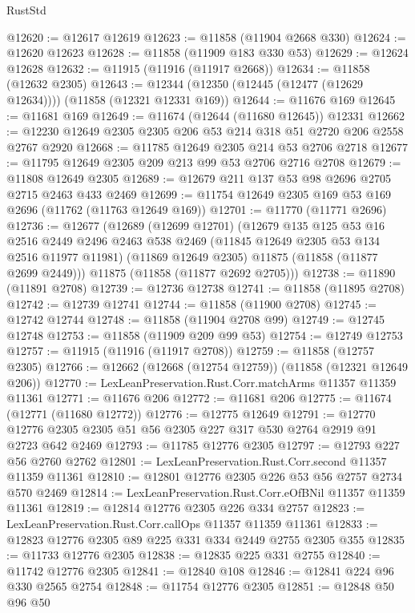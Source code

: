 \begin{lexlean}{RustStd}
\begin{coremodule}
@12620 := @12617 @12619
@12623 := @11858 (@11904 @2668 @330)
@12624 := @12620 @12623
@12628 := @11858 (@11909 @183 @330 @53)
@12629 := @12624 @12628
@12632 := @11915 (@11916 (@11917 @2668))
@12634 := @11858 (@12632 @2305)
@12643 := @12344 (@12350 (@12445 (@12477 (@12629 @12634)))) (@11858 (@12321 @12331 @169))
@12644 := @11676 @169
@12645 := @11681 @169
@12649 := @11674 (@12644 (@11680 @12645)) @12331
@12662 := @12230 @12649 @2305 @2305 @206 @53 @214 @318 @51 @2720 @206 @2558 @2767 @2920
@12668 := @11785 @12649 @2305 @214 @53 @2706 @2718
@12677 := @11795 @12649 @2305 @209 @213 @99 @53 @2706 @2716 @2708
@12679 := @11808 @12649 @2305
@12689 := @12679 @211 @137 @53 @98 @2696 @2705 @2715 @2463 @433 @2469
@12699 := @11754 @12649 @2305 @169 @53 @169 @2696 (@11762 (@11763 @12649 @169))
@12701 := @11770 (@11771 @2696)
@12736 := @12677
    (@12689
      (@12699 @12701)
      (@12679
        @135
        @125
        @53
        @16
        @2516
        @2449
        @2496
        @2463
        @538
        @2469
        (@11845 @12649 @2305 @53 @134 @2516 @11977 @11981)
        (@11869 @12649 @2305)
        @11875
        (@11858 (@11877 @2699 @2449)))
      @11875
      (@11858 (@11877 @2692 @2705)))
@12738 := @11890 (@11891 @2708)
@12739 := @12736 @12738
@12741 := @11858 (@11895 @2708)
@12742 := @12739 @12741
@12744 := @11858 (@11900 @2708)
@12745 := @12742 @12744
@12748 := @11858 (@11904 @2708 @99)
@12749 := @12745 @12748
@12753 := @11858 (@11909 @209 @99 @53)
@12754 := @12749 @12753
@12757 := @11915 (@11916 (@11917 @2708))
@12759 := @11858 (@12757 @2305)
@12766 := @12662 (@12668 (@12754 @12759)) (@11858 (@12321 @12649 @206))
@12770 := LexLeanPreservation.Rust.Corr.matchArms @11357 @11359 @11361
@12771 := @11676 @206
@12772 := @11681 @206
@12775 := @11674 (@12771 (@11680 @12772))
@12776 := @12775 @12649
@12791 := @12770 @12776 @2305 @2305 @51 @56 @2305 @227 @317 @530 @2764 @2919 @91 @2723 @642 @2469
@12793 := @11785 @12776 @2305
@12797 := @12793 @227 @56 @2760 @2762
@12801 := LexLeanPreservation.Rust.Corr.second @11357 @11359 @11361
@12810 := @12801 @12776 @2305 @226 @53 @56 @2757 @2734 @570 @2469
@12814 := LexLeanPreservation.Rust.Corr.eOfBNil @11357 @11359 @11361
@12819 := @12814 @12776 @2305 @226 @334 @2757
@12823 := LexLeanPreservation.Rust.Corr.callOps @11357 @11359 @11361
@12833 := @12823 @12776 @2305 @89 @225 @331 @334 @2449 @2755 @2305 @355
@12835 := @11733 @12776 @2305
@12838 := @12835 @225 @331 @2755
@12840 := @11742 @12776 @2305
@12841 := @12840 @108
@12846 := @12841 @224 @96 @330 @2565 @2754
@12848 := @11754 @12776 @2305
@12851 := @12848 @50 @96 @50

\end{coremodule}
\end{lexlean}
